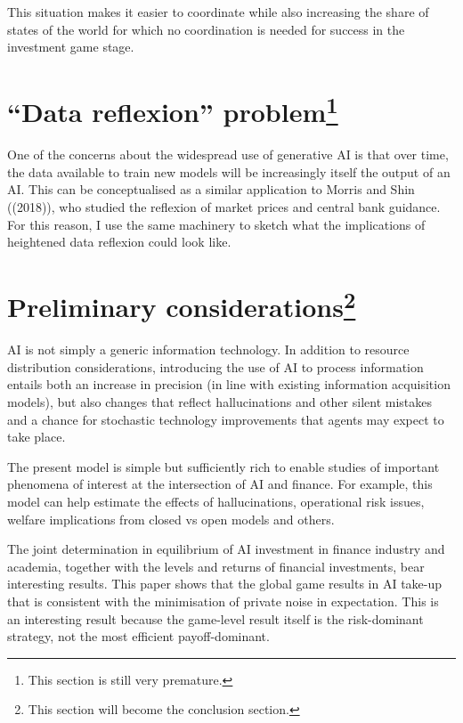 \documentclass[
]{article}
\theoremstyle{plain}
\theoremstyle{definition}
\theoremstyle{remark}
\begin{document}
This situation makes it easier to coordinate while also increasing the
share of states of the world for which no coordination is needed for
success in the investment game stage.

\hypertarget{data-reflexion-problemwipdata}{%
\section[``Data reflexion'' problem]{\texorpdfstring{``Data reflexion''
problem\footnote{This section is still very premature.}}{``Data reflexion'' problem}}\label{data-reflexion-problemwipdata}}

One of the concerns about the widespread use of generative AI is that
over time, the data available to train new models will be increasingly
itself the output of an AI. This can be conceptualised as a similar
application to Morris and Shin ((2018)), who studied the reflexion of
market prices and central bank guidance. For this reason, I use the same
machinery to sketch what the implications of heightened data reflexion
could look like.

\hypertarget{preliminary-considerationsconcl}{%
\section[Preliminary considerations]{\texorpdfstring{Preliminary
considerations\footnote{This section will become the conclusion section.}}{Preliminary considerations}}\label{preliminary-considerationsconcl}}

AI is not simply a generic information technology. In addition to
resource distribution considerations, introducing the use of AI to
process information entails both an increase in precision (in line with
existing information acquisition models), but also changes that reflect
hallucinations and other silent mistakes and a chance for stochastic
technology improvements that agents may expect to take place.

The present model is simple but sufficiently rich to enable studies of
important phenomena of interest at the intersection of AI and finance.
For example, this model can help estimate the effects of hallucinations,
operational risk issues, welfare implications from closed vs open models
and others.

The joint determination in equilibrium of AI investment in finance
industry and academia, together with the levels and returns of financial
investments, bear interesting results. This paper shows that the global
game results in AI take-up that is consistent with the minimisation of
private noise in expectation. This is an interesting result because the
game-level result itself is the risk-dominant strategy, not the most
efficient payoff-dominant.
\end{document}
